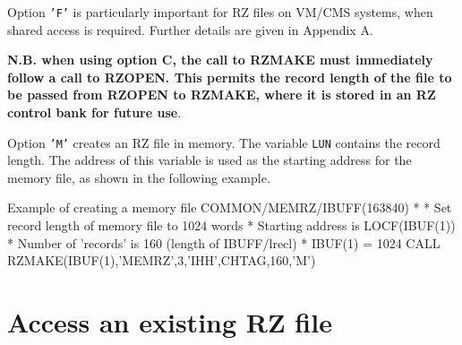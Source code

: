 \finalnewpage

Option {\tt'F'} is particularly important for RZ files on
VM/CMS systems, when shared access is required. Further
details are given in Appendix A.

{\bf N.B. when using option C, the call to RZMAKE must 
immediately follow a call to RZOPEN. This permits the
record length of the file to be passed from RZOPEN to RZMAKE,
where it is stored in an RZ control bank for future use}.

Option {\tt'M'} creates an RZ file in memory. The
variable {\tt LUN} contains the record length.
The address of this variable is used as the starting
address for the memory file, as shown in the following example.
\begin{XMPt}{Example of creating a memory file}
      COMMON/MEMRZ/IBUFF(163840)
*
*     Set record length of memory file to 1024 words
*     Starting address is LOCF(IBUF(1))
*     Number of 'records' is 160 (length of IBUFF/lrecl)
*
      IBUF(1) = 1024
      CALL RZMAKE(IBUF(1),'MEMRZ',3,'IHH',CHTAG,160,'M')
\end{XMPt}

\section{Access an existing RZ file}


